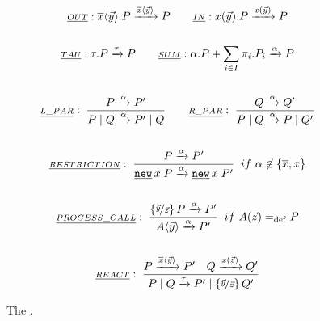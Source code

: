 \begin{figure}[H]
\begin{gather*}
\underline{\scriptstyle{OUT}}: \out{x}{\vec{y}}.P \transs{\out{x}{\vec{y}}} P
\quad\quad
\underline{\scriptstyle{IN}}: \inp{x}{\vec{y}}.P \transs{\inp{x}{\vec{y}}} P
\\\\
\underline{\scriptstyle{TAU}}: \tau.P \transs{\tau} P
\quad\quad
\underline{\scriptstyle{SUM}}: \procchoice{\alpha.P}{\procsum} \transs{\alpha} P
\\\\
\kalRule[]{L\_PAR}{}{P \transs{\alpha} P'}{\procpar{P}{Q} \transs{\alpha} \procpar{P'}{Q}}
\quad\quad
\kalRule[]{R\_PAR}{}{Q \transs{\alpha} Q'}{\procpar{P}{Q} \transs{\alpha} \procpar{P}{Q'}}
\\\\
\kalRule[if\ \alpha \nin \{\overline{x},x\}]{RESTRICTION}{}{P \transs{\alpha} P'}{\procres{x}{P} \transs{\alpha} \procres{x}{P'}}
\\\\
\kalRule[if\ \procdef{A}{\vec{z}}\define{}P]{PROCESS\_CALL}{}{\substitue{\vec{y}}{\vec{z}}P \transs{\alpha} P'}{\proccall{A}{\vec{y}} \transs{\alpha} P'}
\\\\
\kalRule[]{REACT}{P \transs{\out{x}{\vec{y}}} P'}{Q \transs{\inp{x}{\vec{z}}} Q'}{\procpar{P}{Q} \transs{\tau} \procpar{P'}{\substitue{\vec{y}}{\vec{z}}Q'}}
\end{gather*}
\caption{The  \cite{milner}.}
\label{fig_transition_rules}
\end{figure}

